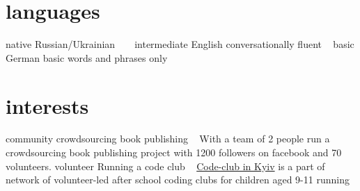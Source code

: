 \documentclass[hidelinks,a4paper]{cv}
\begin{document}
\section{languages}
\begin{entrylist}
  \entry
   {native}
   {Russian/Ukrainian}
   {~}
   {~}
  \entry
   {intermediate}
   {English}
   {conversationally fluent}
   {~}
  \entry
   {basic}
   {German}
   {basic words and phrases only}
   {~}
\end{entrylist}

\section{interests}
\begin{entrylist}
   \entry
    {community}
    {crowdsourcing book publishing}
    {~}
    {
    With a team of 2 people run a crowdsourcing book publishing project with 1200 followers on facebook and 70 volunteers.
    }
   \entry
    {volunteer}
    {Running a code club}
    {~}
    {\href{https://www.codeclub.org.uk/}{Code-club in Kyiv} is a part of network of volunteer-led after school coding clubs for children aged 9-11}
   \entry
    {running}
    {~}
    {~}
    {~}
\end{entrylist}
\end{document}
